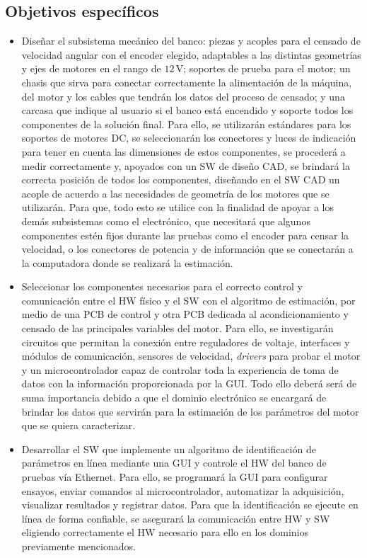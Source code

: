     \subsection{Objetivos específicos}
        \begin{itemize}
            \item Diseñar el subsistema mecánico del banco: piezas y acoples para el censado de velocidad angular con el encoder elegido, adaptables a las distintas geometrías y ejes de motores en el rango de $12$\,V; soportes de prueba para el motor; un chasis que sirva para conectar correctamente la alimentación de la máquina, del motor y los cables que tendrán los datos del proceso de censado; y una carcasa que indique al usuario si el banco está encendido y soporte todos los componentes de la solución final. Para ello, se utilizarán estándares para los soportes de motores DC, se seleccionarán los conectores y luces de indicación para tener en cuenta las dimensiones de estos componentes, se procederá a medir correctamente y, apoyados con un \ac{SW} de diseño \ac{CAD}, se brindará la correcta posición de todos los componentes, diseñando en el \ac{SW} \ac{CAD} un acople de acuerdo a las necesidades de geometría de los motores que se utilizarán. Para que, todo esto se utilice con la finalidad de apoyar a los demás subsistemas como el electrónico, que necesitará que algunos componentes estén fijos durante las pruebas como el encoder para censar la velocidad, o los conectores de potencia y de información que se conectarán a la computadora donde se realizará la estimación.
        
            \item Seleccionar los componentes necesarios para el correcto control y comunicación entre el \ac{HW} físico y el \ac{SW} con el algoritmo de estimación, por medio de una \ac{PCB} de control y otra \ac{PCB} dedicada al acondicionamiento y censado de las principales variables del motor. Para ello, se investigarán circuitos que permitan la conexión entre reguladores de voltaje, interfaces y módulos de comunicación, sensores de velocidad, \textit{drivers} para probar el motor y un microcontrolador capaz de controlar toda la experiencia de toma de datos con la información proporcionada por la \ac{GUI}. Todo ello deberá será de suma importancia debido a que el dominio electrónico se encargará de brindar los datos que servirán para la estimación de los parámetros del motor que se quiera caracterizar.
        
            \item Desarrollar el \ac{SW} que implemente un algoritmo de identificación de parámetros en línea mediante una \ac{GUI} y controle el \ac{HW} del banco de pruebas vía Ethernet. Para ello, se programará la \ac{GUI} para configurar ensayos, enviar comandos al microcontrolador, automatizar la adquisición, visualizar resultados y registrar datos. Para que la identificación se ejecute en línea de forma confiable, se asegurará la comunicación entre \ac{HW} y \ac{SW} eligiendo correctamente el \ac{HW} necesario para ello en los dominios previamente mencionados.
        

\end{itemize}
